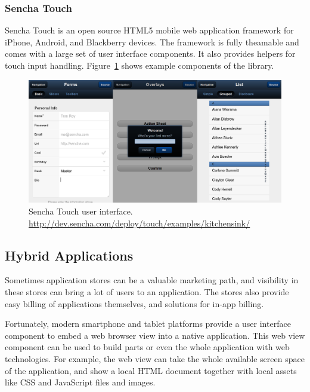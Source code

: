 \subsubsection{Sencha Touch}

Sencha Touch is an open source HTML5 mobile web application framework
for iPhone, Android, and Blackberry devices. The framework is fully
theamable and comes with a large set of user interface components. It
also provides helpers for touch input
handling. Figure~\ref{figure:sencha.png} shows example components of
the library.

\begin{figure}[ht]
  \begin{center}
    \includegraphics[width=\textwidth]{images/sencha.png}
    \caption{Sencha Touch user
      interface. \url{http://dev.sencha.com/deploy/touch/examples/kitchensink/}}
    \label{figure:sencha.png}
  \end{center}
\end{figure}

\subsection{Hybrid Applications}

Sometimes application stores can be a valuable marketing path, and
visibility in these stores can bring a lot of users to an
application. The stores also provide easy billing of applications
themselves, and solutions for in-app billing. \citationneeded

Fortunately, modern smartphone and tablet platforms provide a user
interface component to embed a web browser view into a native
application. This web view component can be used to build parts or
even the whole application with web technologies. For example, the web
view can take the whole available screen space of the application, and
show a local HTML document together with local assets like CSS and
JavaScript files and images.

